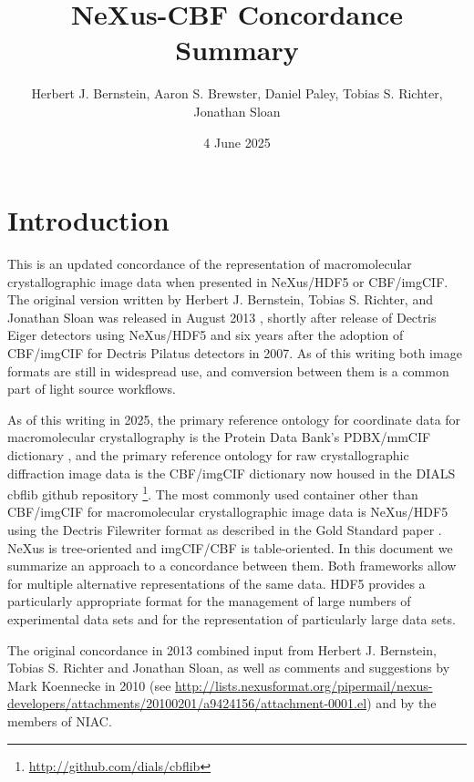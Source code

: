 \documentclass[11pt]{article}
\title{NeXus-CBF Concordance Summary}
\author{Herbert J. Bernstein, Aaron S. Brewster, Daniel Paley, Tobias S. Richter, Jonathan Sloan}
\date{4 June 2025}                                           %
\begin{document}
\maketitle
\onecolumn
\tableofcontents
\newpage

\section{Introduction}

This is an updated concordance of the representation of macromolecular crystallographic
image data when presented in NeXus/HDF5 or CBF/imgCIF.  The original version written
by Herbert J. Bernstein, Tobias S. Richter, and Jonathan Sloan was released
in August 2013 \cite{bernstein2013managing}, shortly after release of Dectris Eiger detectors using NeXus/HDF5 and six
years after the adoption of CBF/imgCIF for Dectris Pilatus detectors in 2007.  As of
this writing both image formats are still in widespread use, and comversion between them
is a common part of light source workflows.

As of this writing in 2025, the primary reference ontology for coordinate data for macromolecular
crystallography is the Protein Data Bank's PDBX/mmCIF dictionary \cite{westbrook2022pdbx},
and the primary reference ontology for raw crystallographic diffraction image data
is the CBF/imgCIF dictionary \cite{bernstein20062} now housed in the DIALS cbflib github
repository \footnote{\url{http://github.com/dials/cbflib}}.  The most commonly used container
other than CBF/imgCIF for macromolecular crystallographic image data is NeXus/HDF5
\cite{konnecke2015nexus} using the Dectris Filewriter format as described in the
Gold Standard paper \cite{bernstein2020gold}.  NeXus is tree-oriented and imgCIF/CBF is table-oriented.  
In this document we summarize an approach to a concordance between them.  Both 
frameworks allow for multiple alternative 
representations of the same data.  HDF5 provides a particularly appropriate format
for the management of large numbers of experimental data sets and for the representation
of particularly large data sets.

                                                                                                                                                                                                                                        

The original concordance in 2013 combined input from Herbert J. Bernstein, Tobias S. Richter and Jonathan Sloan,
as well as comments and suggestions by Mark Koennecke in 2010
(see \url{http://lists.nexusformat.org/pipermail/nexus-developers/attachments/20100201/a9424156/attachment-0001.el})
and by the members of NIAC.
\end{document}
